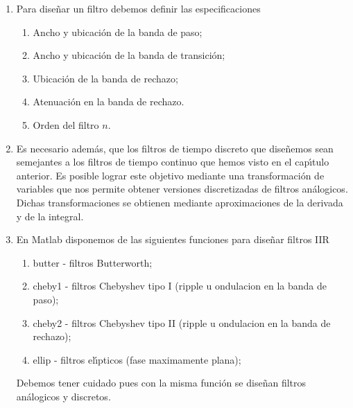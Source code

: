 \begin{enumerate}
        \item   Para dise\~{n}ar un filtro debemos definir las especificaciones
        \begin{enumerate}
        
                \item   Ancho y ubicaci\'{o}n de la banda de paso;
                
                \item   Ancho y ubicaci\'{o}n de la banda de transici\'{o}n;
                
                \item   Ubicaci\'{o}n de la banda de rechazo;
                
                \item   Atenuaci\'{o}n en la banda de rechazo.

                \item   Orden del filtro $n$.
                
        \end{enumerate}

        \item   Es necesario adem\'{a}s, que los filtros de tiempo discreto que dise\~{n}emos
          sean semejantes a los filtros de tiempo continuo que hemos visto en el cap\'{\i}tulo anterior.
          Es posible lograr este objetivo mediante una transformaci\'{o}n de variables que nos permite
          obtener versiones discretizadas de filtros an\'{a}logicos. Dichas transformaciones se obtienen
          mediante aproximaciones de la derivada y de la integral.

        \item   En Matlab disponemos de las siguientes funciones para dise\~{n}ar filtros IIR
        \begin{enumerate}

                \item   butter  - filtros Butterworth;

                \item   cheby1  - filtros Chebyshev tipo I (ripple u ondulacion en la banda de  paso);

                \item   cheby2  - filtros Chebyshev tipo II (ripple u ondulacion en la banda de  rechazo);

                \item   ellip   - filtros el\'{\i}pticos (fase maximamente plana);
       \end{enumerate}
        Debemos tener cuidado pues con la misma  funci\'{o}n se dise\~{n}an filtros an\'{a}logicos y 
        discretos.
        

\end{enumerate}
